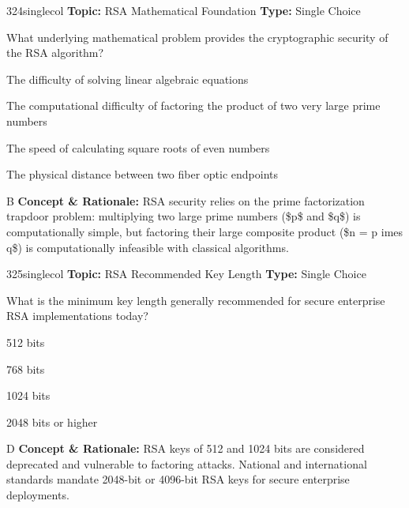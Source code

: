 \begin{qcard}{324}{singlecol}
\textcolor{darkslate!75}{\small\textbf{Topic:} RSA Mathematical Foundation \hfill \textbf{Type:} Single Choice}\vspace{0.4em}\par
What underlying mathematical problem provides the cryptographic security of the RSA algorithm?
\begin{qoptions}
\item The difficulty of solving linear algebraic equations
\item The computational difficulty of factoring the product of two very large prime numbers
\item The speed of calculating square roots of even numbers
\item The physical distance between two fiber optic endpoints
\end{qoptions}
\end{qcard}
\nopagebreak
\begin{explainbox}{B}
\textbf{Concept \& Rationale:} RSA security relies on the prime factorization trapdoor problem: multiplying two large prime numbers (\$p\$ and \$q\$) is computationally simple, but factoring their large composite product (\$n = p 	imes q\$) is computationally infeasible with classical algorithms.
\end{explainbox}

\begin{qcard}{325}{singlecol}
\textcolor{darkslate!75}{\small\textbf{Topic:} RSA Recommended Key Length \hfill \textbf{Type:} Single Choice}\vspace{0.4em}\par
What is the minimum key length generally recommended for secure enterprise RSA implementations today?
\begin{qoptions}
\item 512 bits
\item 768 bits
\item 1024 bits
\item 2048 bits or higher
\end{qoptions}
\end{qcard}
\nopagebreak
\begin{explainbox}{D}
\textbf{Concept \& Rationale:} RSA keys of 512 and 1024 bits are considered deprecated and vulnerable to factoring attacks. National and international standards mandate 2048-bit or 4096-bit RSA keys for secure enterprise deployments.
\end{explainbox}

